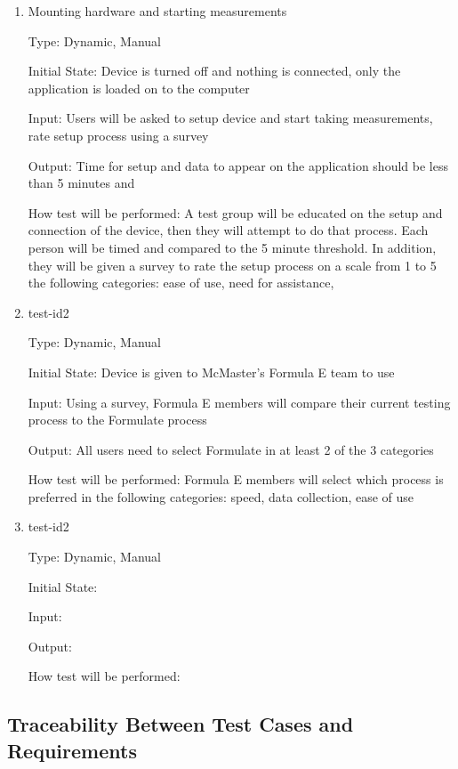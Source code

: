 \documentclass[12pt, titlepage]{article}
\begin{document}
\begin{enumerate}

\item{Mounting hardware and starting measurements\\}

Type: Dynamic, Manual
          
Initial State: Device is turned off and nothing is connected, only the application is loaded on to the computer
          
Input: Users will be asked to setup device and start taking measurements, rate setup process using a survey
          
Output: Time for setup and data to appear on the application should be less than 5 minutes and 
          
How test will be performed: A test group will be educated on the setup and connection of the device, then they will attempt to do that process. 
Each person will be timed and compared to the 5 minute threshold. In addition, they will be given a survey to rate the setup process on a scale from 
1 to 5 the following categories: ease of use, need for assistance,  

\item{test-id2\\}

Type: Dynamic, Manual
					
Initial State: Device is given to McMaster's Formula E team to use
					
Input: Using a survey, Formula E members will compare their current testing process to the Formulate process
					
Output: All users need to select Formulate in at least 2 of the 3 categories
					
How test will be performed: Formula E members will select which process is preferred in the following categories: speed, data collection, ease of use

\item{test-id2\\}

Type: Dynamic, Manual
					
Initial State: 
					
Input: 
					
Output: 
					
How test will be performed: 

\end{enumerate}

\subsection{Traceability Between Test Cases and Requirements}
\end{document}
